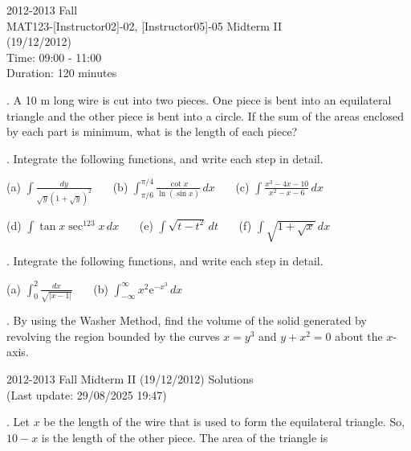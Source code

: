 \documentclass{article}
\begin{document}
\pagestyle{empty}
\large

\begin{center}
2012-2013 Fall \\MAT123-[Instructor02]-02, [Instructor05]-05 Midterm II\\(19/12/2012)\\Time: 09:00 - 11:00\\Duration: 120 minutes
\end{center}

. A 10 m long wire is cut into two pieces. One piece is bent into an equilateral triangle and the other piece is bent into a circle. If the sum of the areas enclosed by each part is minimum, what is the length of each piece?

\hfill

. Integrate the following functions, and write each step in detail.

\hfill

(a) $\displaystyle\int\frac{dy}{\sqrt{y}\left(1+\sqrt y\right)^2}$ \ \ \ (b) $\displaystyle\int_{\pi/6}^{\pi/4}\frac{\cot x}{\ln(\sin x)}\,dx$ \ \ \ (c) $\displaystyle\int\frac{x^3-4x-10}{x^2-x-6}\,dx$

\hfill

\hfill

(d) $\displaystyle \int\tan x \sec^{123}x\,dx$ \ \ \ (e) $\displaystyle\int\sqrt{t-t^2}\,dt$ \ \ \ (f) $\displaystyle\int\sqrt{1+\sqrt x}\,dx$

\hfill

\hfill

. Integrate the following functions, and write each step in detail.

\hfill

(a) $\displaystyle \int_0^2\frac{dx}{\sqrt{|x-1|}}$ \ \ \ (b) $\displaystyle\int_{-\infty}^{\infty}x^2\mathrm{e}^{-x^3}\,dx$

\hfill

\hfill

. By using the Washer Method, find the volume of the solid generated by revolving the region bounded by the curves $x=y^3$ and $y+x^2=0$ about the $x$-axis.

\newpage

\begin{center}
2012-2013 Fall Midterm II (19/12/2012) Solutions\\
(Last update: 29/08/2025 19:47)
\end{center}

. Let $x$ be the length of the wire that is used to form the equilateral triangle. So, $10-x$ is the length of the other piece. The area of the triangle is
\end{document}
